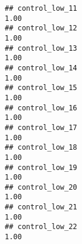 \documentclass[
]{article}
\begin{document}
\begin{verbatim}
## control_low_11                                                                                                                                                                                                                1.00
## control_low_12                                                                                                                                                                                                                1.00
## control_low_13                                                                                                                                                                                                                1.00
## control_low_14                                                                                                                                                                                                                1.00
## control_low_15                                                                                                                                                                                                                1.00
## control_low_16                                                                                                                                                                                                                1.00
## control_low_17                                                                                                                                                                                                                1.00
## control_low_18                                                                                                                                                                                                                1.00
## control_low_19                                                                                                                                                                                                                1.00
## control_low_20                                                                                                                                                                                                                1.00
## control_low_21                                                                                                                                                                                                                1.00
## control_low_22                                                                                                                                                                                                                1.00

\end{verbatim}
\end{document}
